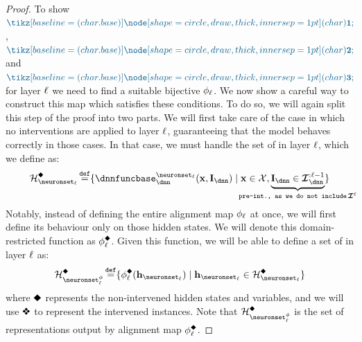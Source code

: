 \begin{proof}
    To show $\inductioncircle{1}$, $\inductioncircle{2}$ and $\inductioncircle{3}$ for layer $\ell$ we need to find a suitable bijective $\phi_{\ell}$.
    We now show a careful way to construct this map which satisfies these conditions.
    To do so, we will again split this step of the proof into two parts.
    We will first take care of the case in which no interventions are applied to layer $\ell$, guaranteeing that the model behaves correctly in those cases.
    In that case, we must handle the set of  in layer $\ell$, which we define as:
    \begin{align}
        \AllInpIntActivationsLayer
        \defeq \{\dnnfunclayer{\neuronset_{\layer}}(\bx, \interventions_{\dnn}) \mid 
        \bx \in \calX, \underbrace{\interventionsdnn \in \interventionsset_{\dnn}^{:\layer-1}}_{\!\!\!\!\!\!\!\!\!\!\!\!\!\!\!\!\!\!\!\!\!\!\!\!\!\!\!\!\!\!\!\!\!\!\!\!\!\!\!\!\!\!\!\!\!\!\!\!\texttt{pre-int., as we do not include}\,\interventionsset^{\layer}\!\!\!\!\!\!\!\!\!\!\!\!\!\!\!\!\!\!\!\!\!\!\!\!\!\!\!\!\!\!\!\!\!\!\!\!\!\!\!\!\!\!\!\!\!\!\!\!} 
        \}
    \end{align}
    Notably, instead of defining the entire alignment map $\phi_{\ell}$ at once, we will first define its behaviour only on those hidden states.
    We will denote this domain-restricted function as $\causalmap_{\layer}^{\noninter}$.
    Given this function, we will be able to define a set of  in layer $\ell$ as:
    \begin{align}
        \AllInpIntTransformedActivationsLayerOneH{\layer}
        \defeq \{
        \causalmap_{\layer}^{\noninter}(\hiddenstates_{\neuronset_{\layer}})
        \mid 
        \hiddenstates_{\neuronset_{\layer}} \in \AllInpIntActivationsLayer \}
    \end{align}
    where $\noninter$ represents the non-intervened hidden states and variables, and we will use $\inter$ to represent the intervened instances.
    Note that $\AllInpIntTransformedActivationsLayerOneH{\layer}$ is the set of representations output by alignment map $\causalmap_{\layer}^{\noninter}$.
    

\end{proof}
